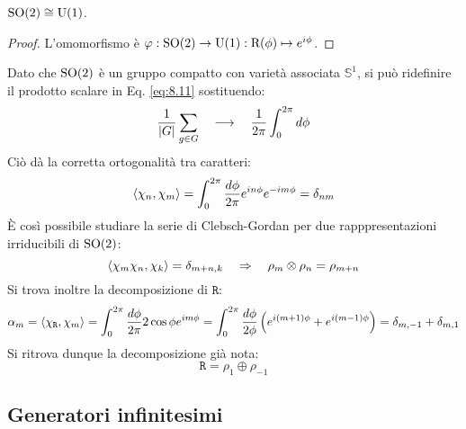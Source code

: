 \begin{proposition}
	$ \mathrm{SO}(2) \cong \mathrm{U}(1) $.
\end{proposition}
\begin{proof}
	L'omomorfismo è $ \varphi : \mathrm{SO}(2) \rightarrow \mathrm{U}(1) : \mathrm{R}(\phi) \mapsto e^{i\phi} $.
\end{proof}

Dato che $ \mathrm{SO}(2) $ è un gruppo compatto con varietà associata $ \mathbb{S}^1 $, si può ridefinire il prodotto scalare in Eq. \ref{eq:8.11} sostituendo:
\begin{equation*}
	\frac{1}{\left\lvert G\right\rvert} \sum_{g \in G} \quad \longrightarrow \quad \frac{1}{2\pi} \int_0^{2\pi} d\phi
\end{equation*}
Ciò dà la corretta ortogonalità tra caratteri:
\begin{equation*}
	\braket{\chi_n, \chi_m} = \int_0^{2\pi} \frac{d\phi}{2\pi} e^{in\phi} e^{-im\phi} = \delta_{nm}
\end{equation*}
È così possibile studiare la serie di Clebsch-Gordan per due rapppresentazioni irriducibili di $ \mathrm{SO}(2) $:
\begin{equation}
	\braket{\chi_m \chi_n, \chi_k} = \delta_{m + n, k}
	\quad \Rightarrow \quad
	\rho_m \otimes \rho_n = \rho_{m + n}
	\label{eq:9.3}
\end{equation}
Si trova inoltre la decomposizione di $ \mathtt{R} $:
\begin{equation*}
	\alpha_m = \braket{\chi_{\mathtt{R}}, \chi_m} = \int_0^{2\pi} \frac{d\phi}{2\pi} 2\cos \phi e^{im\phi} = \int_0^{2\pi} \frac{d\phi}{2\phi} \left( e^{i (m+1) \phi} + e^{i (m - 1)\phi} \right) = \delta_{m,-1} + \delta_{m,1}
\end{equation*}
Si ritrova dunque la decomposizione già nota:
\begin{equation}
	\mathtt{R} = \rho_1 \oplus \rho_{-1}
	\label{eq:9.4}
\end{equation}

\subsection{Generatori infinitesimi}

